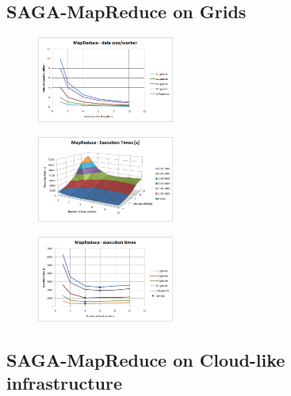 \documentclass[conference,final]{IEEEtran}
\begin{document}
\subsection{SAGA-MapReduce on Grids}

\begin{figure}[t]
  \includegraphics[width=0.4\textwidth]{MapReduce_local_datasizeperworker.png}
\label{1}
\end{figure}

\begin{figure}[t]
  \includegraphics[width=0.4\textwidth]{MapReduce_local_executiontime_3d.png}
\label{2}
\end{figure}

\begin{figure}[t]
  \includegraphics[width=0.4\textwidth]{MapReduce_local_executiontime.png}
\label{3}
\end{figure}




\subsection{SAGA-MapReduce on Cloud-like infrastructure}
\end{document}
